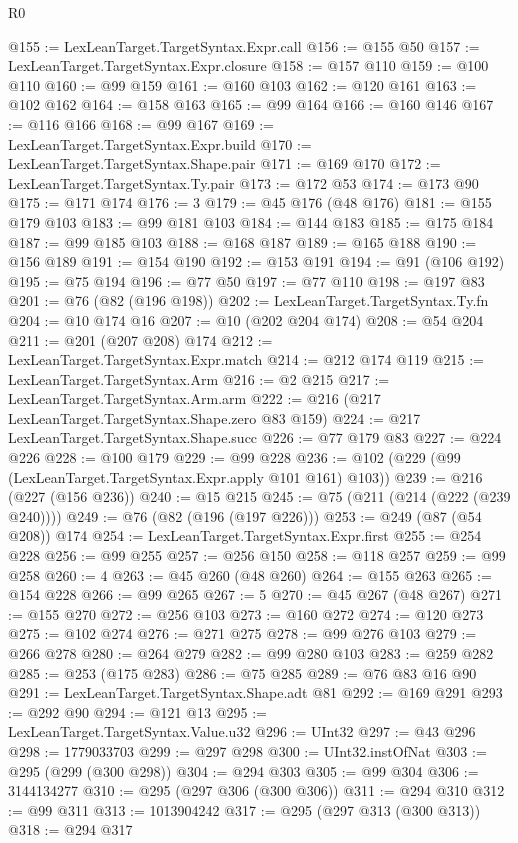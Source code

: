 \begin{lexlean}{R0}
\begin{coremodule}
@155 := LexLeanTarget.TargetSyntax.Expr.call
@156 := @155 @50
@157 := LexLeanTarget.TargetSyntax.Expr.closure
@158 := @157 @110
@159 := @100 @110
@160 := @99 @159
@161 := @160 @103
@162 := @120 @161
@163 := @102 @162
@164 := @158 @163
@165 := @99 @164
@166 := @160 @146
@167 := @116 @166
@168 := @99 @167
@169 := LexLeanTarget.TargetSyntax.Expr.build
@170 := LexLeanTarget.TargetSyntax.Shape.pair
@171 := @169 @170
@172 := LexLeanTarget.TargetSyntax.Ty.pair
@173 := @172 @53
@174 := @173 @90
@175 := @171 @174
@176 := 3
@179 := @45 @176 (@48 @176)
@181 := @155 @179 @103
@183 := @99 @181 @103
@184 := @144 @183
@185 := @175 @184
@187 := @99 @185 @103
@188 := @168 @187
@189 := @165 @188
@190 := @156 @189
@191 := @154 @190
@192 := @153 @191
@194 := @91 (@106 @192)
@195 := @75 @194
@196 := @77 @50
@197 := @77 @110
@198 := @197 @83
@201 := @76 (@82 (@196 @198))
@202 := LexLeanTarget.TargetSyntax.Ty.fn
@204 := @10 @174 @16
@207 := @10 (@202 @204 @174)
@208 := @54 @204
@211 := @201 (@207 @208) @174
@212 := LexLeanTarget.TargetSyntax.Expr.match
@214 := @212 @174 @119
@215 := LexLeanTarget.TargetSyntax.Arm
@216 := @2 @215
@217 := LexLeanTarget.TargetSyntax.Arm.arm
@222 := @216 (@217 LexLeanTarget.TargetSyntax.Shape.zero @83 @159)
@224 := @217 LexLeanTarget.TargetSyntax.Shape.succ
@226 := @77 @179 @83
@227 := @224 @226
@228 := @100 @179
@229 := @99 @228
@236 := @102 (@229 (@99 (LexLeanTarget.TargetSyntax.Expr.apply @101 @161) @103))
@239 := @216 (@227 (@156 @236))
@240 := @15 @215
@245 := @75 (@211 (@214 (@222 (@239 @240))))
@249 := @76 (@82 (@196 (@197 @226)))
@253 := @249 (@87 (@54 @208)) @174
@254 := LexLeanTarget.TargetSyntax.Expr.first
@255 := @254 @228
@256 := @99 @255
@257 := @256 @150
@258 := @118 @257
@259 := @99 @258
@260 := 4
@263 := @45 @260 (@48 @260)
@264 := @155 @263
@265 := @154 @228
@266 := @99 @265
@267 := 5
@270 := @45 @267 (@48 @267)
@271 := @155 @270
@272 := @256 @103
@273 := @160 @272
@274 := @120 @273
@275 := @102 @274
@276 := @271 @275
@278 := @99 @276 @103
@279 := @266 @278
@280 := @264 @279
@282 := @99 @280 @103
@283 := @259 @282
@285 := @253 (@175 @283)
@286 := @75 @285
@289 := @76 @83 @16 @90
@291 := LexLeanTarget.TargetSyntax.Shape.adt @81
@292 := @169 @291
@293 := @292 @90
@294 := @121 @13
@295 := LexLeanTarget.TargetSyntax.Value.u32
@296 := UInt32
@297 := @43 @296
@298 := 1779033703
@299 := @297 @298
@300 := UInt32.instOfNat
@303 := @295 (@299 (@300 @298))
@304 := @294 @303
@305 := @99 @304
@306 := 3144134277
@310 := @295 (@297 @306 (@300 @306))
@311 := @294 @310
@312 := @99 @311
@313 := 1013904242
@317 := @295 (@297 @313 (@300 @313))
@318 := @294 @317

\end{coremodule}
\end{lexlean}
